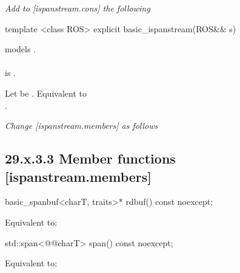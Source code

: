 \documentclass[ebook,11pt,article]{memoir}
\begin{document}
\emph{Add to [ispanstream.cons] the following}

\begin{addedblock}
\begin{itemdecl}
template <class ROS>
explicit basic_ispanstream(ROS&& s)
\end{itemdecl}

\begin{itemdescr}
\pnum
\constraints
{} models .\\
\\  is .

\pnum
\effects
Let  be . 
Equivalent to\\
.
\end{itemdescr}
\end{addedblock}



\emph{Change [ispanstream.members] as follows}
\subsection{29.x.3.3 Member functions [ispanstream.members]}
\label{ispanstream.members}

\begin{itemdecl}
basic_spanbuf<charT, traits>* rdbuf() const noexcept;
\end{itemdecl}

\begin{itemdescr}
\pnum
\effects Equivalent to:\\
\end{itemdescr}

\begin{itemdecl}
std::span<@@charT> span() const noexcept;
\end{itemdecl}

\begin{itemdescr}
\pnum
\effects Equivalent to:\\
\end{itemdescr}
\end{document}
